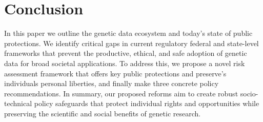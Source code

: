 \section{Conclusion}
\label{section:conclusion}

In this paper we outline the genetic data ecosystem and today's state of public protections. We identify critical gaps in current regulatory federal and state-level frameworks that prevent the productive, ethical, and safe adoption of genetic data for broad societal applications. To address this, we propose a novel risk assessment framework that offers key public protections and preserve's individuals personal liberties, and finally make three concrete policy recommendations. In summary, our proposed reforms aim to create robust socio-technical policy safeguards that protect individual rights and opportunities while preserving the scientific and social benefits of genetic research.




